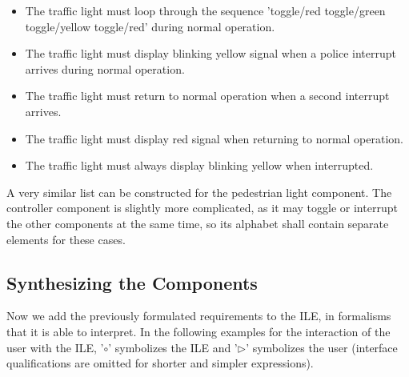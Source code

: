 \begin{itemize}
	\item The traffic light must loop through the sequence 'toggle/red toggle/green toggle/yellow toggle/red' during normal operation.
	\item The traffic light must display blinking yellow signal when a police interrupt arrives during normal operation.
	\item The traffic light must return to normal operation when a second interrupt arrives.
	\item The traffic light must display red signal when returning to normal operation.
	\item The traffic light must always display blinking yellow when interrupted. 

\end{itemize}

A very similar list can be constructed for the pedestrian light component. The controller component is slightly more complicated, as it may toggle or interrupt the other components at the same time, so its alphabet shall contain separate elements for these cases.

\subsection{Synthesizing the Components} \label{subs_casestudysynth}

Now we add the previously formulated requirements to the ILE, in formalisms that it is able to interpret. In the following examples for the interaction of the user with the ILE, '$\circ$' symbolizes the ILE and '$\triangleright$' symbolizes the user (interface qualifications are omitted for shorter and simpler expressions). 

\bigskip
{}


